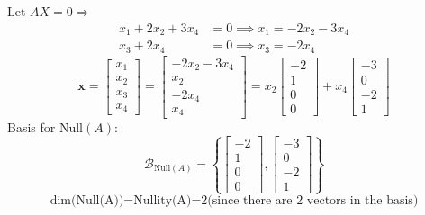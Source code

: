 \documentclass[DIV=20,oneside]{scrartcl}
\begin{document}
Let $AX=0\Rightarrow$
$$\begin{aligned} x_1 + 2x_2 + 3x_4 &= 0 \implies x_1 = -2x_2 - 3x_4 \\ x_3 + 2x_4 &= 0 \implies x_3 = -2x_4 \end{aligned}$$
$$\mathbf{x} = \begin{bmatrix} x_1 \\ x_2 \\ x_3 \\ x_4 \end{bmatrix} = \begin{bmatrix} -2x_2 - 3x_4 \\ x_2 \\ -2x_4 \\ x_4 \end{bmatrix} = x_2 \begin{bmatrix} -2 \\ 1 \\ 0 \\ 0 \end{bmatrix} + x_4 \begin{bmatrix} -3 \\ 0 \\ -2 \\ 1 \end{bmatrix}$$
Basis for $\text{Null}(A)$:$$\mathcal{B}_{\text{Null}(A)} = \left\{ \begin{bmatrix} -2 \\ 1 \\ 0 \\ 0 \end{bmatrix}, \begin{bmatrix} -3 \\ 0 \\ -2 \\ 1 \end{bmatrix} \right\}$$
$$\text{dim(Null(A))=Nullity(A)=2(since there are 2 vectors in the basis)}$$
\end{document}
